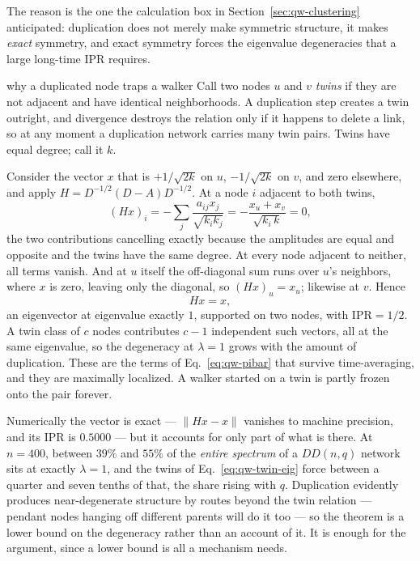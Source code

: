 The reason is the one the calculation box in Section~\ref{sec:qw-clustering}
anticipated: duplication does not merely make symmetric structure, it makes
\emph{exact} symmetry, and exact symmetry forces the eigenvalue degeneracies that a
large long-time IPR requires.

\begin{calculation}{why a duplicated node traps a walker}
Call two nodes $u$ and $v$ \emph{twins} if they are not adjacent and have identical
neighborhoods. A duplication step creates a twin outright, and divergence destroys
the relation only if it happens to delete a link, so at any moment a duplication
network carries many twin pairs. Twins have equal degree; call it $k$.

Consider the vector $x$ that is $+1/\sqrt{2k}$ on $u$, $-1/\sqrt{2k}$ on $v$, and
zero elsewhere, and apply $H=D^{-1/2}(D-A)D^{-1/2}$. At a node $i$ adjacent to both
twins,
\begin{equation}
  (Hx)_i = -\sum_j \frac{a_{ij}x_j}{\sqrt{k_ik_j}}
         = -\frac{x_u + x_v}{\sqrt{k_i\,k}} = 0 ,
  \label{eq:qw-twin-nb}
\end{equation}
the two contributions cancelling exactly because the amplitudes are equal and
opposite and the twins have the same degree. At every node adjacent to neither, all
terms vanish. And at $u$ itself the off-diagonal sum runs over $u$'s neighbors,
where $x$ is zero, leaving only the diagonal, so $(Hx)_u = x_u$; likewise at $v$.
Hence
\begin{equation}
  Hx = x ,
  \label{eq:qw-twin-eig}
\end{equation}
an eigenvector at eigenvalue exactly $1$, supported on two nodes, with
$\mathrm{IPR}=1/2$. A twin class of $c$ nodes contributes $c-1$ independent such
vectors, all at the same eigenvalue, so the degeneracy at $\lambda=1$ grows with the
amount of duplication. These are the terms of Eq.~\eqref{eq:qw-pibar} that survive
time-averaging, and they are maximally localized. A walker started on a twin is
partly frozen onto the pair forever.

Numerically the vector is exact --- $\|Hx-x\|$ vanishes to machine precision, and its
IPR is $0.5000$ --- but it accounts for only part of what is there. At $n=400$,
between $39\%$ and $55\%$ of the \emph{entire spectrum} of a $DD(n,q)$ network sits at
exactly $\lambda=1$, and the twins of Eq.~\eqref{eq:qw-twin-eig} force between a
quarter and seven tenths of that, the share rising with $q$. Duplication evidently
produces near-degenerate structure by routes beyond the twin relation --- pendant
nodes hanging off different parents will do it too --- so the theorem is a lower bound
on the degeneracy rather than an account of it. It is enough for the argument, since a
lower bound is all a mechanism needs.
\end{calculation}


